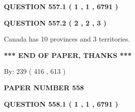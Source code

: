 \documentclass[12pt]{article}
\begin{document}
   
   
   
 \vspace{0.2in}
 
 
 
 
   
   
  
\vspace{0.2in}
  
{\textbf{\Large{QUESTION
557.1 
 ( 1 , 1 , 6791 )
}}}
  
  
  
\vspace{0.2in}
  
{\textbf{\Large{QUESTION
557.2 
 ( 2 , 2 , 3 )
}}}
  
  
 
 
\noindent{}
 
 
Canada has 10  provinces and 3 territories.
 
 
 
 
   
   
 \vspace{0.2in}
 
   
   
   
   
\vspace{1.0in} 
{\textbf{\large{ *** END OF PAPER, THANKS *** }}} 
   
   
\hspace{1.0in} By: 
 239 ( 416 ,  613 )
   
   
   
   
\newpage 
\setcounter{page}{ 
   558001 } 
   
   
   
   
 {\textbf{ \Large{ PAPER NUMBER  558  }}}
   
   
\vspace{0.2in}
   
   
   
   
   
   
 \vspace{0.2in}
 
 
 
 
   
   
  
\vspace{0.2in}
  
{\textbf{\Large{QUESTION
558.1 
 ( 1 , 1 , 6791 )
}}}
  
\end{document}
